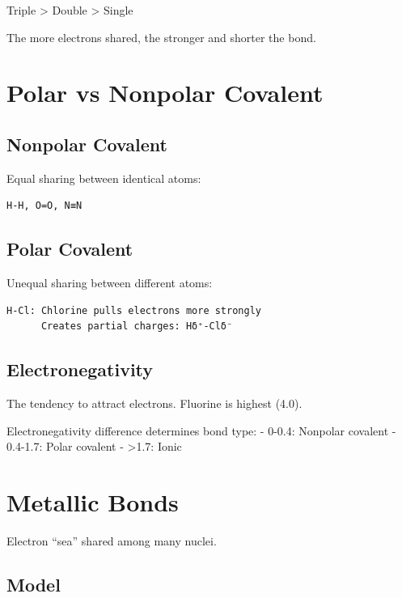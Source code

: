 \documentclass[
  11pt,
  letterpaper,
  twoside,
  openright]{book}
\begin{document}
Triple \textgreater{} Double \textgreater{} Single

The more electrons shared, the stronger and shorter the bond.

\section{Polar vs Nonpolar Covalent}\label{polar-vs-nonpolar-covalent}

\subsection{Nonpolar Covalent}\label{nonpolar-covalent}

Equal sharing between identical atoms:

\begin{verbatim}
H-H, O=O, N≡N
\end{verbatim}

\subsection{Polar Covalent}\label{polar-covalent}

Unequal sharing between different atoms:

\begin{verbatim}
H-Cl: Chlorine pulls electrons more strongly
      Creates partial charges: Hδ⁺-Clδ⁻
\end{verbatim}

\subsection{Electronegativity}\label{electronegativity-1}

The tendency to attract electrons. Fluorine is highest (4.0).

Electronegativity difference determines bond type: - 0-0.4: Nonpolar
covalent - 0.4-1.7: Polar covalent - \textgreater1.7: Ionic

\section{Metallic Bonds}\label{metallic-bonds}

Electron ``sea'' shared among many nuclei.

\subsection{Model}\label{model}
\end{document}

